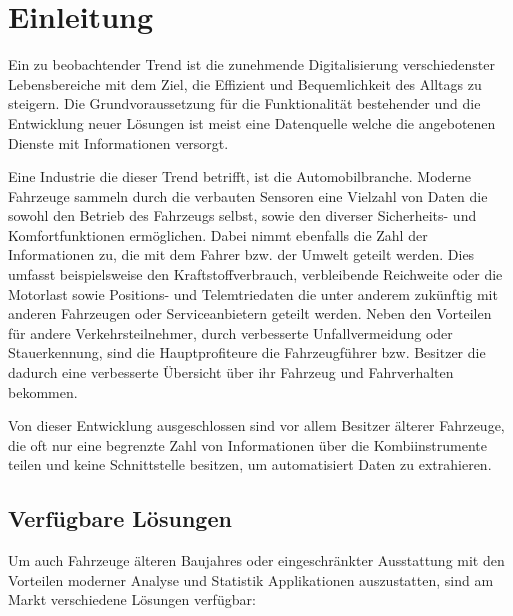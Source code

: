 \chapter{Einleitung}

Ein zu beobachtender Trend ist die zunehmende Digitalisierung verschiedenster Lebensbereiche mit dem Ziel, die Effizient und Bequemlichkeit des Alltags zu steigern. Die Grundvoraussetzung für die Funktionalität bestehender und die Entwicklung neuer Lösungen ist meist eine Datenquelle welche die angebotenen Dienste mit Informationen versorgt. 

Eine Industrie die dieser Trend betrifft, ist die Automobilbranche. Moderne Fahrzeuge sammeln durch die verbauten Sensoren eine Vielzahl von Daten die sowohl den Betrieb des Fahrzeugs selbst, sowie den diverser Sicherheits- und Komfortfunktionen ermöglichen. Dabei nimmt ebenfalls die Zahl der Informationen zu, die mit dem Fahrer bzw. der Umwelt geteilt werden. Dies umfasst beispielsweise den Kraftstoffverbrauch, verbleibende Reichweite oder die Motorlast sowie Positions- und Telemtriedaten die unter anderem zukünftig mit anderen Fahrzeugen oder Serviceanbietern geteilt werden. Neben den Vorteilen für andere Verkehrsteilnehmer, durch verbesserte Unfallvermeidung oder Stauerkennung, sind die Hauptprofiteure die Fahrzeugführer bzw. Besitzer die dadurch eine verbesserte Übersicht über ihr Fahrzeug und Fahrverhalten bekommen.

Von dieser Entwicklung ausgeschlossen sind vor allem Besitzer älterer Fahrzeuge, die oft nur eine begrenzte Zahl von Informationen über die Kombiinstrumente teilen und keine Schnittstelle besitzen, um automatisiert Daten zu extrahieren. 

\section{Verfügbare Lösungen}
\label{sec:solutions}
Um auch Fahrzeuge älteren Baujahres oder eingeschränkter Ausstattung mit den Vorteilen moderner Analyse und Statistik Applikationen auszustatten, sind am Markt verschiedene Lösungen verfügbar:

